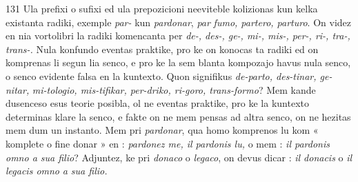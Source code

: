 \begin{VUpage}[135]{131}
Ula prefixi o sufixi ed ula prepozicioni neeviteble kolizionas\nl
kun kelka existanta radiki, exemple \textit{par-} kun \textit{pardonar}, \textit{par}\cc
\textit{fumo, partero, parturo}. On videz en nia vortolibri la radiki\nl
komencanta per \textit{de-, des-, ge-, mi-, mis-, per-, ri-, tra-, trans-.}\nl
Nula konfundo eventas praktike, pro ke on konocas ta\nl
radiki ed on komprenas li segun lia senco, e pro ke la sem\cc
blanta kompozajo havus nula senco, o senco evidente falsa\nl
en la kuntexto. Quon signifikus \textit{de-parto, des-tinar, ge-nitar,}\nl
\textit{mi-tologio, mis-tifikar, per-driko, ri-goro, trans-formo}? Mem\nl
kande dusenceso esus teorie posibla, ol ne eventas praktike,\nl
pro ke la kuntexto determinas klare la senco, e fakte on ne\nl
mem pensas ad altra senco, on ne hezitas mem dum un\nl
instanto. Mem pri \textit{pardonar}, qua homo komprenos lu kom\nl
« komplete o fine donar » en : \textit{pardonez me, il pardonis lu,}\nl
o mem : \textit{il pardonis omno a sua filio}? Adjuntez, ke pri\nl
\textit{donaco} o \textit{legaco}, on devus dicar : \textit{il donacis} o \textit{il legacis omno}\nl
\textit{a sua filio.}
\end{VUpage}

